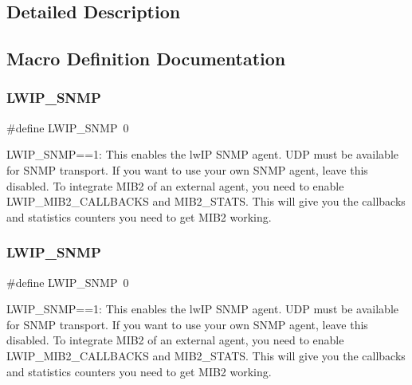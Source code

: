 \subsection{Detailed Description}


\subsection{Macro Definition Documentation}
\mbox{\label{group__snmp__opts_gaf4900859dc53f19f5f67cc34e48ad68c}} 
\subsubsection{\texorpdfstring{L\+W\+I\+P\+\_\+\+S\+N\+MP}{LWIP\_SNMP}\hspace{0.1cm}{\footnotesize\ttfamily [1/2]}}
{\footnotesize\ttfamily \#define L\+W\+I\+P\+\_\+\+S\+N\+MP~0}

L\+W\+I\+P\+\_\+\+S\+N\+MP==1\+: This enables the lw\+IP S\+N\+MP agent. U\+DP must be available for S\+N\+MP transport. If you want to use your own S\+N\+MP agent, leave this disabled. To integrate M\+I\+B2 of an external agent, you need to enable L\+W\+I\+P\+\_\+\+M\+I\+B2\+\_\+\+C\+A\+L\+L\+B\+A\+C\+KS and M\+I\+B2\+\_\+\+S\+T\+A\+TS. This will give you the callbacks and statistics counters you need to get M\+I\+B2 working. \mbox{\label{group__snmp__opts_gaf4900859dc53f19f5f67cc34e48ad68c}} 
\subsubsection{\texorpdfstring{L\+W\+I\+P\+\_\+\+S\+N\+MP}{LWIP\_SNMP}\hspace{0.1cm}{\footnotesize\ttfamily [2/2]}}
{\footnotesize\ttfamily \#define L\+W\+I\+P\+\_\+\+S\+N\+MP~0}

L\+W\+I\+P\+\_\+\+S\+N\+MP==1\+: This enables the lw\+IP S\+N\+MP agent. U\+DP must be available for S\+N\+MP transport. If you want to use your own S\+N\+MP agent, leave this disabled. To integrate M\+I\+B2 of an external agent, you need to enable L\+W\+I\+P\+\_\+\+M\+I\+B2\+\_\+\+C\+A\+L\+L\+B\+A\+C\+KS and M\+I\+B2\+\_\+\+S\+T\+A\+TS. This will give you the callbacks and statistics counters you need to get M\+I\+B2 working. \mbox{\label{group__snmp__opts_ga316c1e1f06f0c7ca56589563809e64db}} 
